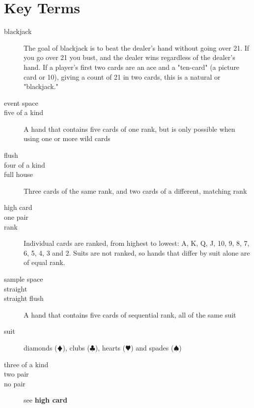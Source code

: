 \documentclass{article}
\begin{document}
\section{Key Terms}
\begin{description}
 \item[blackjack] The goal of blackjack is to beat the dealer's hand without going over 21. If you go over 21 you bust, and the dealer wins regardless of the dealer's hand. If a player's first two cards are an ace and a "ten-card" (a picture card or 10), giving a count of 21 in two cards, this is a natural or "blackjack."
 \item[event space]
 \item[five of a kind] A hand that contains five cards of one rank, but is only possible when using one or more wild cards
 \item[flush] 
 \item[four of a kind]
 \item[full house] Three cards of the same rank, and two cards of a different, matching rank
 \item[high card]
 \item[one pair]
 \item[rank] Individual cards are ranked, from highest to lowest: A, K, Q, J, 10, 9, 8, 7, 6, 5, 4, 3 and 2. Suits are not ranked, so hands that differ by suit alone are of equal rank.
 \item[sample space]
 \item[straight]
 \item[straight flush] A hand that contains five cards of sequential rank, all of the same suit
 \item[suit] diamonds ($\vardiamond$), clubs ($\clubsuit$), hearts ($\varheart$) and spades ($\spadesuit$)
 \item[three of a kind]
 \item[two pair]
 \item[no pair] see \textbf{high card}
\end{description}
\end{document}
